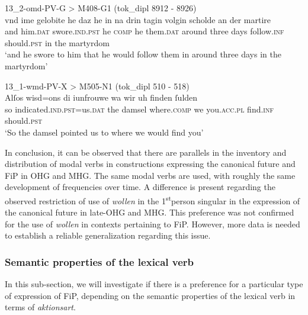 \documentclass[output=paper,colorlinks,citecolor=brown]{langscibook}
\begin{document}
\largerpage[-1]

\ea \label{ex:petrova_chen:petrova_chen:20} 13\_2-omd-PV-G > M408-G1 (tok\_dipl 8912 - 8926)\\
\gll vnd ime gelobite he daz he in na drin tagin volgin scholde an der martire\\
and him.\textsc{dat} swore.\textsc{ind.pst} he \textsc{comp} he them.\textsc{dat} around three days follow.\textsc{inf} should.\textsc{pst} in the martyrdom\\
\glt ‘and he swore to him that he would follow them in around three days in the martyrdom’
\z

\ea \label{ex:petrova_chen:petrova_chen:21} 13\_1-wmd-PV-X > M505-N1 (tok\_dipl 510 - 518)\\
\gll Alſos wisd=ons di iunfrouwe wa wir uh finden ſulden\\
so indicated.\textsc{ind.pst}=us.\textsc{dat} the damsel where.\textsc{comp} we you.\textsc{acc.pl} find.\textsc{inf} should.\textsc{pst}\\
\glt ‘So the damsel pointed us to where we would find you’
\z

In conclusion, it can be observed that there are parallels in the inventory and distribution of modal verbs in constructions expressing the canonical future and FiP in OHG and MHG. The same modal verbs are used, with roughly the same development of frequencies over time. A difference is present regarding the observed restriction of use of \textit{wollen} in the 1\textsuperscript{st}person singular in the expression of the canonical future in late-OHG and MHG. This preference was not confirmed for the use of \textit{wollen} in contexts pertaining to FiP. However, more data is needed to establish a reliable generalization regarding this issue. 



\subsubsection{Semantic properties of the lexical verb} \label{section 4.2.4}

In this sub-section, we will investigate if there is a preference for a particular type of expression of FiP, depending on the semantic properties of the lexical verb in terms of \textit{aktionsart}.
\end{document}
